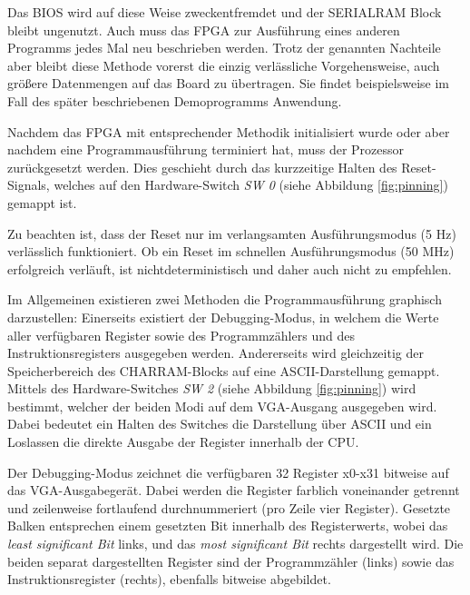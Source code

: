 Das BIOS wird auf diese Weise zweckentfremdet und der SERIALRAM Block bleibt ungenutzt. Auch muss das FPGA zur Ausf\"uhrung eines anderen Programms jedes Mal neu beschrieben werden. Trotz der genannten Nachteile aber bleibt diese Methode vorerst die einzig verl\"assliche Vorgehensweise, auch gr\"o\ss{}ere Datenmengen auf das Board zu \"ubertragen. Sie findet beispielsweise im Fall des sp\"ater beschriebenen Demoprogramms Anwendung.


Nachdem das FPGA mit entsprechender Methodik initialisiert wurde oder aber nachdem eine Programmausf\"uhrung terminiert hat, muss der Prozessor zur\"uckgesetzt werden. Dies geschieht durch das kurzzeitige Halten des Reset-Signals, welches auf den Hardware-Switch \textit{SW 0} (siehe Abbildung \ref{fig:pinning}) gemappt ist.

Zu beachten ist, dass der Reset nur im verlangsamten Ausf\"uhrungsmodus (5 Hz) verl\"asslich funktioniert. Ob ein Reset im schnellen Ausf\"uhrungsmodus (50 MHz) erfolgreich verl\"auft, ist nichtdeterministisch und daher auch nicht zu empfehlen.


Im Allgemeinen existieren zwei Methoden die Programmausf\"uhrung graphisch darzustellen: Einerseits existiert der Debugging-Modus, in welchem die Werte aller verf\"ugbaren Register sowie des Programmz\"ahlers und des Instruktionsregisters ausgegeben werden. Andererseits wird gleichzeitig der Speicherbereich des CHARRAM-Blocks auf eine ASCII-Darstellung gemappt. Mittels des Hardware-Switches \textit{SW 2} (siehe Abbildung \ref{fig:pinning}) wird bestimmt, welcher der beiden Modi auf dem VGA-Ausgang ausgegeben wird. Dabei bedeutet ein Halten des Switches die Darstellung \"uber ASCII und ein Loslassen die direkte Ausgabe der Register innerhalb der CPU.


Der Debugging-Modus zeichnet die verf\"ugbaren 32 Register x0-x31 bitweise auf das VGA-Ausgabeger\"at. Dabei werden die Register farblich voneinander getrennt und zeilenweise fortlaufend durchnummeriert (pro Zeile vier Register). Gesetzte Balken entsprechen einem gesetzten Bit innerhalb des Registerwerts, wobei das \textit{least significant Bit} links, und das \textit{most significant Bit} rechts dargestellt wird.
Die beiden separat dargestellten Register sind der Programmz\"ahler (links) sowie das Instruktionsregister (rechts), ebenfalls bitweise abgebildet.

